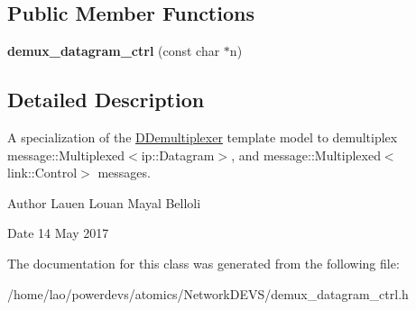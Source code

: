 \subsection*{Public Member Functions}
\begin{DoxyCompactItemize}
\item 
{\bfseries demux\+\_\+datagram\+\_\+ctrl} (const char $\ast$n)\hypertarget{classdemux__datagram__ctrl_a7050bdccd44e5d73aff6cba0d44234d1}{}\label{classdemux__datagram__ctrl_a7050bdccd44e5d73aff6cba0d44234d1}

\end{DoxyCompactItemize}


\subsection{Detailed Description}
A specialization of the \hyperlink{classDDemultiplexer}{D\+Demultiplexer} template model to demultiplex message\+::\+Multiplexed$<$ip\+::\+Datagram$>$, and message\+::\+Multiplexed$<$link\+::\+Control$>$ messages. 

\begin{DoxyAuthor}{Author}
Lauen Louan Mayal Belloli 
\end{DoxyAuthor}
\begin{DoxyDate}{Date}
14 May 2017 
\end{DoxyDate}


The documentation for this class was generated from the following file\+:\begin{DoxyCompactItemize}
\item 
/home/lao/powerdevs/atomics/\+Network\+D\+E\+V\+S/demux\+\_\+datagram\+\_\+ctrl.\+h\end{DoxyCompactItemize}
